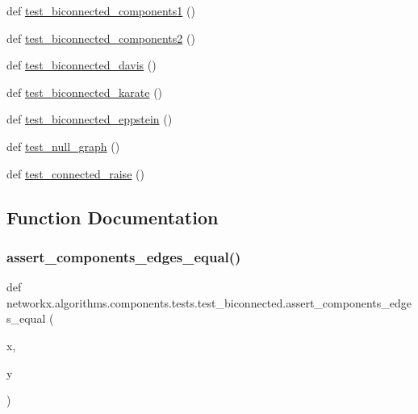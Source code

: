 \begin{DoxyCompactItemize}
def \hyperlink{namespacenetworkx_1_1algorithms_1_1components_1_1tests_1_1test__biconnected_a9606a42fc3e83205016928b457ace50a}{test\+\_\+biconnected\+\_\+components1} ()
\item 
def \hyperlink{namespacenetworkx_1_1algorithms_1_1components_1_1tests_1_1test__biconnected_aab1b0510f1761d3b6a27c96ca54eb490}{test\+\_\+biconnected\+\_\+components2} ()
\item 
def \hyperlink{namespacenetworkx_1_1algorithms_1_1components_1_1tests_1_1test__biconnected_aa7b556ab42a46dfe9d9bf113d807151a}{test\+\_\+biconnected\+\_\+davis} ()
\item 
def \hyperlink{namespacenetworkx_1_1algorithms_1_1components_1_1tests_1_1test__biconnected_a8117a499c96c6cc5b04505d44d4c6fa9}{test\+\_\+biconnected\+\_\+karate} ()
\item 
def \hyperlink{namespacenetworkx_1_1algorithms_1_1components_1_1tests_1_1test__biconnected_a601a45256983b5e652b63db7d3c9834c}{test\+\_\+biconnected\+\_\+eppstein} ()
\item 
def \hyperlink{namespacenetworkx_1_1algorithms_1_1components_1_1tests_1_1test__biconnected_a876094db8ad0627351780006025a5653}{test\+\_\+null\+\_\+graph} ()
\item 
def \hyperlink{namespacenetworkx_1_1algorithms_1_1components_1_1tests_1_1test__biconnected_ae1b5b5b5986f3c7482f26c82cd43bc0e}{test\+\_\+connected\+\_\+raise} ()
\end{DoxyCompactItemize}


\subsection{Function Documentation}
\mbox{\label{namespacenetworkx_1_1algorithms_1_1components_1_1tests_1_1test__biconnected_a19ea1178b60510fa6e98ab8f311e6929}} 
\subsubsection{\texorpdfstring{assert\+\_\+components\+\_\+edges\+\_\+equal()}{assert\_components\_edges\_equal()}}
{\footnotesize\ttfamily def networkx.\+algorithms.\+components.\+tests.\+test\+\_\+biconnected.\+assert\+\_\+components\+\_\+edges\+\_\+equal (\begin{DoxyParamCaption}\item[{}]{x,  }\item[{}]{y }\end{DoxyParamCaption})}

